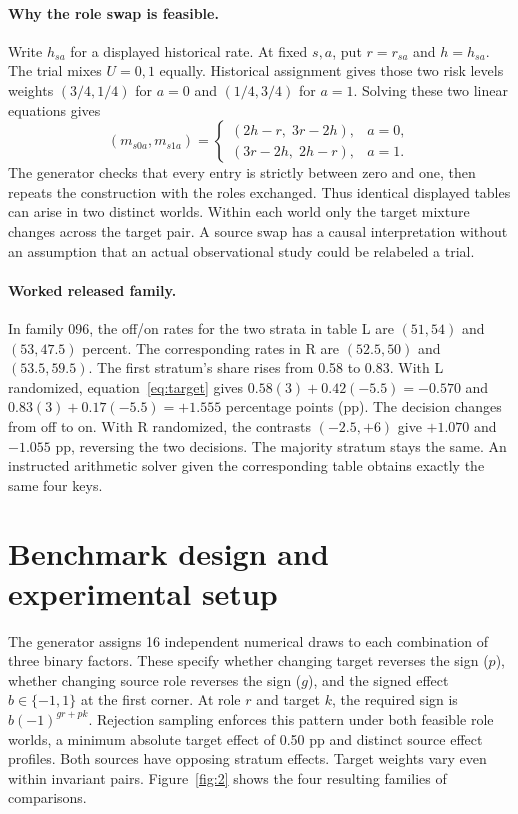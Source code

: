 \paragraph{Why the role swap is feasible.}
Write $h_{sa}$ for a displayed historical rate. At fixed $s,a$, put $r=r_{sa}$ and $h=h_{sa}$. The trial mixes $U=0,1$ equally. Historical assignment gives those two risk levels weights $(3/4,1/4)$ for $a=0$ and $(1/4,3/4)$ for $a=1$. Solving these two linear equations gives
\[
(m_{s0a},m_{s1a})=
\begin{cases}
(2h-r,\;3r-2h),&a=0,\\
(3r-2h,\;2h-r),&a=1.
\end{cases}
\]
The generator checks that every entry is strictly between zero and one, then repeats the construction with the roles exchanged. Thus identical displayed tables can arise in two distinct worlds. Within each world only the target mixture changes across the target pair. A source swap has a causal interpretation without an assumption that an actual observational study could be relabeled a trial.

\paragraph{Worked released family.}
In family 096, the off/on rates for the two strata in table L are $(51,54)$ and $(53,47.5)$ percent. The corresponding rates in R are $(52.5,50)$ and $(53.5,59.5)$. The first stratum's share rises from 0.58 to 0.83. With L randomized, equation~\eqref{eq:target} gives $0.58(3)+0.42(-5.5)=-0.570$ and $0.83(3)+0.17(-5.5)=+1.555$ percentage points (pp). The decision changes from off to on. With R randomized, the contrasts $(-2.5,+6)$ give $+1.070$ and $-1.055$ pp, reversing the two decisions. The majority stratum stays the same. An instructed arithmetic solver given the corresponding table obtains exactly the same four keys.

\section{Benchmark design and experimental setup}
The generator assigns 16 independent numerical draws to each combination of three binary factors. These specify whether changing target reverses the sign ($p$), whether changing source role reverses the sign ($g$), and the signed effect $b\in\{-1,1\}$ at the first corner. At role $r$ and target $k$, the required sign is $b(-1)^{gr+pk}$. Rejection sampling enforces this pattern under both feasible role worlds, a minimum absolute target effect of 0.50 pp and distinct source effect profiles. Both sources have opposing stratum effects. Target weights vary even within invariant pairs. Figure~\ref{fig:2} shows the four resulting families of comparisons.

